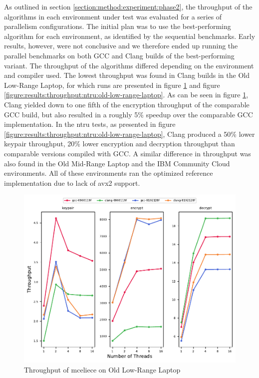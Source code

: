 As outlined in section \ref{section:method:experiment:phase2}, the throughput of the algorithms in each environment under test was evaluated for a series of parallelism configurations. The initial plan was to use the best-performing algorithm for each environment, as identified by the sequential benchmarks. Early results, however, were not conclusive and we therefore ended up running the parallel benchmarks on both GCC and Clang builds of the best-performing variant. The throughput of the algorithms differed depending on the environment and compiler used. The lowest throughput was found in Clang builds in the Old Low-Range Laptop, for which runs are presented in figure \ref{figure:results:throughput:mceliece:old-low-range-laptop} and figure \ref{figure:results:throughput:ntru:old-low-range-laptop}. As can be seen in figure \ref{figure:results:throughput:mceliece:old-low-range-laptop}, Clang yielded down to one fifth of the encryption throughput of the comparable GCC build, but also resulted in a roughly 5\% speedup over the comparable GCC implementation. In the \gls{ntru} tests, as presented in figure \ref{figure:results:throughput:ntru:old-low-range-laptop}, Clang produced a 50\% lower keypair throughput, 20\% lower encryption and decryption throughput than comparable versions compiled with GCC. A similar difference in throughput was also found in the Old Mid-Range Laptop and the IBM Community Cloud environments. All of these environments ran the optimized reference implementation due to lack of \gls{avx2} support.

\begin{figure}
    \centering
    \includegraphics[scale=0.75]{chapters/results/throughput/Old Low-Range Laptop_mceliece.pdf}
    \caption{Throughput of \gls{mceliece} on Old Low-Range Laptop}
    \label{figure:results:throughput:mceliece:old-low-range-laptop}
\end{figure}

